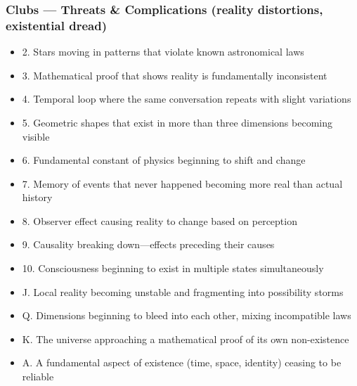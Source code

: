 \documentclass[11pt]{article}
\begin{document}
\subsubsection{Clubs --- Threats \& Complications (reality distortions, existential dread)}
\begin{itemize}[leftmargin=*]
\item 2. Stars moving in patterns that violate known astronomical laws
\item 3. Mathematical proof that shows reality is fundamentally inconsistent
\item 4. Temporal loop where the same conversation repeats with slight variations
\item 5. Geometric shapes that exist in more than three dimensions becoming visible
\item 6. Fundamental constant of physics beginning to shift and change
\item 7. Memory of events that never happened becoming more real than actual history
\item 8. Observer effect causing reality to change based on perception
\item 9. Causality breaking down---effects preceding their causes
\item 10. Consciousness beginning to exist in multiple states simultaneously
\item J. Local reality becoming unstable and fragmenting into possibility storms
\item Q. Dimensions beginning to bleed into each other, mixing incompatible laws
\item K. The universe approaching a mathematical proof of its own non-existence
\item A. A fundamental aspect of existence (time, space, identity) ceasing to be reliable
\end{itemize}
\end{document}
